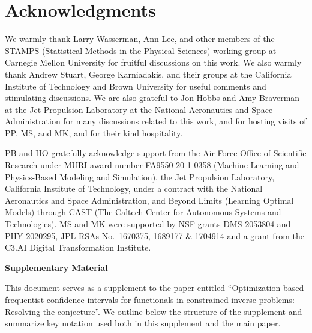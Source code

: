 \documentclass[11pt]{article}
\numberwithin{equation}{section}
\numberwithin{figure}{section}
\newcommand{\titletext}{Optimization-based frequentist confidence intervals for functionals in constrained inverse problems: Resolving the \rustburrus conjecture}
\begin{document}

\section*{Acknowledgments}

We warmly thank Larry Wasserman, Ann Lee, and other members of the STAMPS (Statistical Methods in the Physical Sciences) working group at Carnegie Mellon University for fruitful discussions on this work.
We also warmly thank Andrew Stuart, George Karniadakis, and their groups at the California Institute of Technology and Brown University for useful comments and stimulating discussions.
We are also grateful to Jon Hobbs and Amy Braverman at the Jet Propulsion Laboratory at the National Aeronautics and Space Administration for many discussions related to this work, and for hosting visits of PP, MS, and MK, and for their kind hospitality.

PB and HO gratefully acknowledge support from the Air Force Office of Scientific Research under MURI award number FA9550-20-1-0358 (Machine Learning and Physics-Based Modeling and Simulation), the Jet Propulsion Laboratory, California Institute of Technology, under a contract with the National Aeronautics and Space Administration, and Beyond Limits (Learning Optimal Models) through CAST (The Caltech Center for Autonomous Systems and Technologies). MS and MK were supported by NSF grants DMS-2053804 and PHY-2020295, JPL RSAs No.\ 1670375, 1689177 \& 1704914 and a grant from the C3.AI Digital Transformation Institute.




\clearpage
\appendix

\newcommand{\removelinebreaks}[1]{%
      \def\\{\relax}#1}
\def\titleRLB{\removelinebreaks{\titletext}}

\begin{center}
\Large
{
{\bf
\underline{Supplementary Material}}
}
\end{center}

\bigskip

This document serves as a supplement to the paper entitled ``Optimization-based frequentist confidence intervals for functionals in constrained inverse problems: Resolving the \rustburrus conjecture''.
We outline below the structure of the supplement and summarize key notation used both in this supplement and the main paper.
\end{document}
